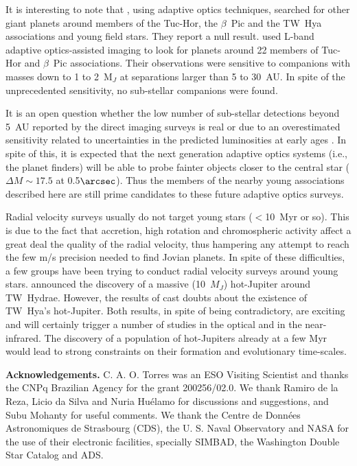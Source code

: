 \documentclass[11pt,twoside]{book}
\begin{document}
It is interesting to note that \cite{masciadri05}, using adaptive optics
techniques, searched for other giant planets around members of the Tuc-Hor, the $\beta$~Pic and
the TW~Hya associations and young field stars.
They report a null result.
\cite{kasper07} used L-band adaptive optics-assisted imaging to look for
planets around 22 members of Tuc-Hor and $\beta$~Pic associations.
Their observations were sensitive to companions with masses down to 1 to 2~M$_J$
at separations larger than 5 to 30~AU. In spite of the unprecedented sensitivity, no sub-stellar
companions were found.

It is an open question whether the low number of sub-stellar detections beyond
5~AU reported by the direct imaging surveys is real or due to an
overestimated sensitivity related to uncertainties
in the predicted luminosities at early ages \citep{marley07}.
In spite of this, it is expected that the next generation adaptive optics systems
(i.e., the planet finders) will be able to probe fainter objects  closer to the central star
($\Delta M \sim17.5$ at 0.5$\arcsec$). Thus the members of the nearby  young associations described
here are still prime candidates to these future adaptive optics surveys.

Radial velocity surveys usually do not target young stars ($<$10~Myr
or so).  This is due to the fact that accretion, high rotation and
chromospheric activity affect a great deal the quality of the radial
velocity, thus hampering any attempt to reach the few m/s precision
needed to find Jovian planets.  In spite of these difficulties, a few
groups have been trying to conduct radial velocity surveys around
young stars.  \citet{setiawan08} announced the discovery of a massive
(10~$M_J$) hot-Jupiter around TW~Hydrae.  However, the results of
\citet{nuria08b} cast doubts about the existence of TW~Hya's
hot-Jupiter. Both results, in spite of being contradictory, are
exciting and will certainly trigger a number of studies in the optical
and in the near-infrared.  The discovery of a population of
hot-Jupiters already at a few Myr would lead to strong constraints on
their formation and evolutionary time-scales.

\vspace{0.5cm}

{\bf Acknowledgements.}
C. A. O. Torres was an ESO Visiting Scientist and
thanks the CNPq Brazilian Agency for the grant 200256/02.0.
We thank Ramiro de la Reza, Licio da Silva and Nuria  Hu{\'e}lamo
for discussions and suggestions, and Subu Mohanty for useful comments.
We thank the Centre de Donn\'{e}es Astronomiques de Strasbourg (CDS), the
U. S. Naval Observatory and NASA for the use of their electronic facilities,
specially SIMBAD, the Washington Double Star Catalog and  ADS.
\end{document}

